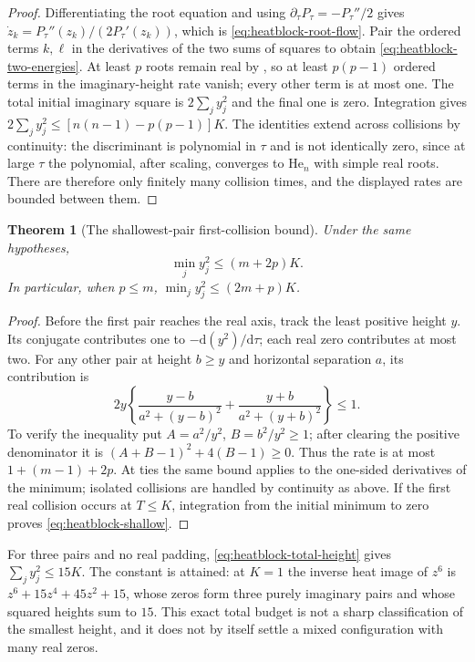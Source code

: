 \documentclass[11pt]{article}
\newtheorem{theorem}{Theorem}[section]
\theoremstyle{definition}
\theoremstyle{remark}
\newcommand{\dd}{\mathrm d}
\begin{document}
\begin{proof}
Differentiating the root equation and using
$\partial_\tau P_\tau=-P_\tau''/2$ gives
$\dot z_k=P_\tau''(z_k)/(2P_\tau'(z_k))$, which is
\eqref{eq:heatblock-root-flow}.  Pair the ordered terms $k,\ell$ in
the derivatives of the two sums of squares to obtain
\eqref{eq:heatblock-two-energies}.
At least $p$ roots remain real by
, so at least $p(p-1)$ ordered terms
in the imaginary-height rate vanish; every other term is at most one.
The total initial imaginary square is $2\sum_jy_j^2$ and the final
one is zero.  Integration gives
$2\sum_jy_j^2\le[n(n-1)-p(p-1)]K$.
The identities extend across collisions by continuity: the discriminant
is polynomial in $\tau$ and is not identically zero, since at large
$\tau$ the polynomial, after scaling, converges to $\mathrm{He}_n$
with simple real roots.  There are therefore only finitely many
collision times, and the displayed rates are bounded between them.
\end{proof}

\begin{theorem}[The shallowest-pair first-collision bound]
\label{thm:heatblock-shallow}
Under the same hypotheses,
\begin{equation}
 \min_j y_j^2\le(m+2p)K.
 \label{eq:heatblock-shallow}
\end{equation}
In particular, when $p\le m$,
$\min_jy_j^2\le(2m+p)K$.
\end{theorem}

\begin{proof}
Before the first pair reaches the real axis, track the least positive
height $y$.  Its conjugate contributes one to $-\dd(y^2)/\dd\tau$;
each real zero contributes at most two.  For any other pair at height
$b\ge y$ and horizontal separation $a$, its contribution is
\[
 2y\left\{\frac{y-b}{a^2+(y-b)^2}
          +\frac{y+b}{a^2+(y+b)^2}\right\}\le1.
\]
To verify the inequality put $A=a^2/y^2$, $B=b^2/y^2\ge1$; after
clearing the positive denominator it is
$(A+B-1)^2+4(B-1)\ge0$.
Thus the rate is at most $1+(m-1)+2p$.  At ties the same bound applies
to the one-sided derivatives of the minimum; isolated collisions are
handled by continuity as above.  If the first real collision occurs at
$T\le K$, integration from the initial minimum to zero proves
\eqref{eq:heatblock-shallow}.
\end{proof}

For three pairs and no real padding, \eqref{eq:heatblock-total-height}
gives $\sum_jy_j^2\le15K$.  The constant is attained: at $K=1$ the
inverse heat image of $z^6$ is
$z^6+15z^4+45z^2+15$, whose zeros form three purely imaginary pairs
and whose squared heights sum to $15$.  This exact total budget is not
a sharp classification of the smallest height, and it does not by
itself settle a mixed configuration with many real zeros.
\end{document}
